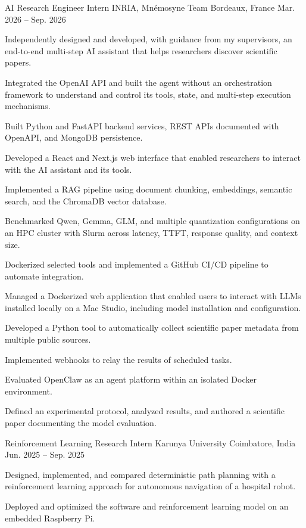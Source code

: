 
\begin{cventries}
  \cventry
    {AI Research Engineer Intern}
    {INRIA, Mnémosyne Team}
    {Bordeaux, France}
    {Mar. 2026 -- Sep. 2026}
    {
      \begin{cvitems}
        \item {Independently designed and developed, with guidance from my supervisors, an end-to-end multi-step AI assistant that helps researchers discover scientific papers.}
        \item {Integrated the OpenAI API and built the agent without an orchestration framework to understand and control its tools, state, and multi-step execution mechanisms.}
        \item {Built Python and FastAPI backend services, REST APIs documented with OpenAPI, and MongoDB persistence.}
        \item {Developed a React and Next.js web interface that enabled researchers to interact with the AI assistant and its tools.}
        \item {Implemented a RAG pipeline using document chunking, embeddings, semantic search, and the ChromaDB vector database.}
        \item {Benchmarked Qwen, Gemma, GLM, and multiple quantization configurations on an HPC cluster with Slurm across latency, TTFT, response quality, and context size.}
        \item {Dockerized selected tools and implemented a GitHub CI/CD pipeline to automate integration.}
        \item {Managed a Dockerized web application that enabled users to interact with LLMs installed locally on a Mac Studio, including model installation and configuration.}
        \item {Developed a Python tool to automatically collect scientific paper metadata from multiple public sources.}
        \item {Implemented webhooks to relay the results of scheduled tasks.}
        \item {Evaluated OpenClaw as an agent platform within an isolated Docker environment.}
        \item {Defined an experimental protocol, analyzed results, and authored a scientific paper documenting the model evaluation.}
      \end{cvitems}
    }

  \cventry
    {Reinforcement Learning Research Intern}
    {Karunya University}
    {Coimbatore, India}
    {Jun. 2025 -- Sep. 2025}
    {
      \begin{cvitems}
        \item {Designed, implemented, and compared deterministic path planning with a reinforcement learning approach for autonomous navigation of a hospital robot.}
        \item {Deployed and optimized the software and reinforcement learning model on an embedded Raspberry Pi.}
      \end{cvitems}
    }
\end{cventries}
